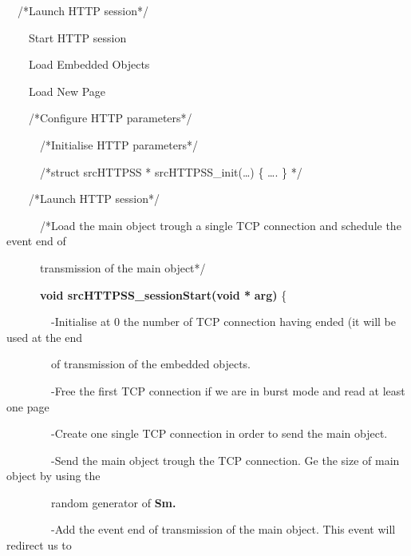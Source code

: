 \documentclass[a4paper]{article}
\begin{document}
{
\ \ /*Launch HTTP session*/}

{
\ \ \ \ Start HTTP session}

{
\ \ \ \ Load Embedded Objects}

{
\ \ \ \ Load New Page}



\bigskip

{
\ \ \ \ /*Configure HTTP parameters*/}

{
\ \ \ \ \ \ /*Initialise HTTP parameters*/}

{
\ \ \ \ \ \ /*struct srcHTTPSS * srcHTTPSS\_init({\dots}) \{ {\dots}. \}
*/}


\bigskip


\bigskip

{
\ \ \ \ /*Launch HTTP session*/}

{
\ \ \ \ \ \ /*Load the main object trough a single TCP connection and schedule the event end of}

{
\ \ \ \ \ \ transmission of the main object*/}\linebreak

{
\ \ \ \ \ \ \textbf{void srcHTTPSS\_sessionStart(}\textbf{void
*}\textbf{ arg)} \{}

{
\ \ \ \ \ \ \ \ {}-Initialise at 0 the number of TCP connection having ended (it will be used at the end}

{
\ \ \ \ \ \ \ \ of transmission of the embedded objects.}

{
\ \ \ \ \ \ \ \ {}-Free the first TCP connection if we are in burst mode and read at least one page}


{
\ \ \ \ \ \ \ \ {}-Create one single TCP connection in order to send the main object.}

{
\ \ \ \ \ \ \ \ {}-Send the main object trough the TCP connection. Ge the size of main object by using the}

{
\ \ \ \ \ \ \ \ random generator of \textbf{Sm.}}

{
\ \ \ \ \ \ \ \ {}-Add the event end of transmission of the main object. This event will redirect us to}
\end{document}
